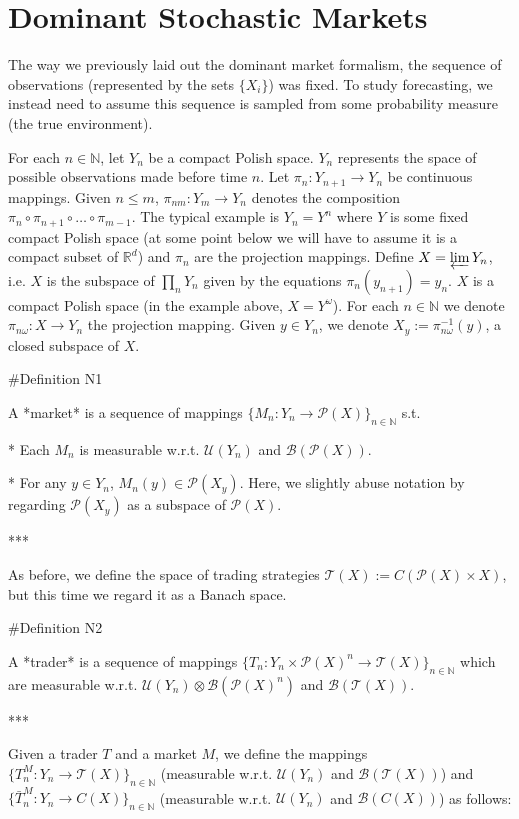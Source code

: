 \documentclass[a4paper]{article}
\newcommand{\Nats}{\mathbb{N}}
\newcommand{\Reals}{\mathbb{R}}
\newcommand{\Prob}{\mathcal{P}}
\newcommand{\T}{\mathcal{T}}
\newcommand{\B}{\mathcal{B}}
\newcommand{\UM}{\mathcal{U}}
\begin{document}
\section{Dominant Stochastic Markets}

The way we previously laid out the dominant market formalism, the sequence of observations (represented by the sets $\{X_i\}$) was fixed. To study forecasting, we instead need to assume this sequence is sampled from some probability measure (the true environment).

For each ${n \in \Nats}$, let ${Y_n}$ be a compact Polish space. ${Y_n}$ represents the space of possible observations made before time ${n}$. Let ${\pi_n: Y_{n+1} \rightarrow Y_n}$ be continuous mappings. Given ${n \leq m}$, ${\pi_{nm}: Y_m \rightarrow Y_n}$ denotes the composition $\pi_n \circ \pi_{n+1} \circ \ldots \circ \pi_{m-1}$. The typical example is ${Y_n=Y^n}$ where ${Y}$ is some fixed compact Polish space (at some point below we will have to assume it is a compact subset of ${\Reals^d}$) and ${\pi_n}$ are the projection mappings. Define ${X = \varprojlim Y_n}$, i.e. ${X}$ is the subspace of ${\prod_n Y_n}$ given by the equations ${\pi_n(y_{n+1})=y_n}$. ${X}$ is a compact Polish space (in the example above, ${X = Y^\omega}$). For each ${n \in \Nats}$ we denote ${\pi_{n\omega}: X \rightarrow Y_n}$ the projection mapping. Given ${y \in Y_n}$, we denote ${X_y:=\pi_{n\omega}^{-1}(y)}$, a closed subspace of ${X}$.

\#Definition N1

A *market* is a sequence of mappings ${\{M_n: Y_n \rightarrow \Prob(X)\}}_{n \in \Nats}$ s.t.

* Each ${M_n}$ is measurable w.r.t. ${\UM(Y_n)}$ and ${\B(\Prob(X))}$.

* For any ${y \in Y_n}$, ${M_n(y) \in \Prob(X_y)}$. Here, we slightly abuse notation by regarding ${\Prob(X_y)}$ as a subspace of ${\Prob(X)}$.

***

As before, we define the space of trading strategies ${\T(X):=C(\Prob(X)\times X)}$, but this time we regard it as a Banach space. 

\#Definition N2

A *trader* is a sequence of mappings ${\{T_n: Y_n \times \Prob(X)^n \rightarrow \T(X)\}}_{n \in \Nats}$ which are measurable w.r.t. ${\UM(Y_n) \otimes \B(\Prob(X)^n)}$ and ${\B(\T(X))}$.

***

Given a trader ${T}$ and a market ${M}$, we define the mappings ${\{T^M_n: Y_n \rightarrow \T(X)\}_{n \in \Nats}}$ (measurable w.r.t. ${\UM(Y_n)}$ and ${\B(\T(X))}$) and ${\{\bar{T}^M_n: Y_n \rightarrow C(X)\}_{n \in \Nats}}$ (measurable w.r.t. ${\UM(Y_n)}$ and ${\B(C(X))}$) as follows:
\end{document}

